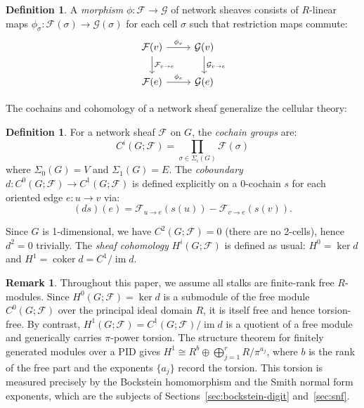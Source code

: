 \documentclass[11pt]{amsart}
\theoremstyle{plain}
\theoremstyle{definition}
\newtheorem{definition}[theorem]{Definition}
\newtheorem{remark}[theorem]{Remark}
\newcommand{\Ring}{R}                          %
\newcommand{\unif}{\pi}                        %
\newcommand{\sheaf}[1]{\mathcal{#1}}                  %
\newcommand{\stalk}[2]{#1(#2)}                        %
\newcommand{\face}{\to}                               %
\newcommand{\res}[3]{#1_{#2 \face #3}}                  %
\newcommand{\coboundary}{d}                           %
\DeclareMathOperator{\im}{im}                         %
\DeclareMathOperator{\coker}{coker}                   %
\begin{document}
\begin{definition}
\label{def:sheaf-morphism}
A \emph{morphism} $\phi: \sheaf{F} \to \sheaf{G}$ of network sheaves consists of $\Ring$-linear maps $\phi_\sigma: \stalk{\sheaf{F}}{\sigma} \to \stalk{\sheaf{G}}{\sigma}$ for each cell $\sigma$ such that restriction maps commute:
\[
\begin{tikzcd}
\stalk{\sheaf{F}}{v} \arrow{r}{\phi_v} \arrow{d}{\res{\sheaf{F}}{v}{e}} & \stalk{\sheaf{G}}{v} \arrow{d}{\res{\sheaf{G}}{v}{e}} \\
\stalk{\sheaf{F}}{e} \arrow{r}{\phi_e} & \stalk{\sheaf{G}}{e}
\end{tikzcd}
\]
\end{definition}

The cochains and cohomology of a network sheaf generalize the cellular theory:

\begin{definition}
\label{def:sheaf-cochains}
For a network sheaf $\sheaf{F}$ on $G$, the \emph{cochain groups} are:
\[
C^i(G; \sheaf{F}) = \prod_{\sigma \in \Sigma_i(G)} \stalk{\sheaf{F}}{\sigma}
\]
where $\Sigma_0(G) = V$ and $\Sigma_1(G) = E$. The \emph{coboundary} $\coboundary: C^0(G; \sheaf{F}) \to C^1(G; \sheaf{F})$ is defined explicitly on a $0$-cochain $s$ for each oriented edge $e:u\to v$ via:
\[
(\coboundary s)(e) = \res{\sheaf{F}}{u}{e}(s(u)) - \res{\sheaf{F}}{v}{e}(s(v)) .
\]
\end{definition}

Since $G$ is 1-dimensional, we have $C^2(G; \sheaf{F}) = 0$ (there are no 2-cells), hence $\coboundary^2 = 0$ trivially. The \emph{sheaf cohomology} $H^i(G; \sheaf{F})$ is defined as usual: $H^0 = \ker \coboundary$ and $H^1 = \coker\coboundary = C^1/\im \coboundary$.

\begin{remark}
\label{rem:H0-free-H1-tors}
Throughout this paper, we assume all stalks are finite-rank free $\Ring$-modules. Since $H^0(G;\sheaf{F}) = \ker \coboundary$ is a submodule of the free module $C^0(G;\sheaf{F})$ over the principal ideal domain $\Ring$, it is itself free and hence torsion-free. By contrast, $H^1(G;\sheaf{F}) = C^1(G;\sheaf{F})/\im \coboundary$ is a quotient of a free module and generically carries $\unif$-power torsion. The structure theorem for finitely generated modules over a PID gives $H^1 \cong \Ring^b \oplus \bigoplus_{j=1}^r \Ring/\unif^{a_j}$, where $b$ is the rank of the free part and the exponents $\{a_j\}$ record the torsion. This torsion is measured precisely by the Bockstein homomorphism and the Smith normal form exponents, which are the subjects of Sections~\ref{sec:bockstein-digit} and~\ref{sec:snf}.
\end{remark}
\end{document}
